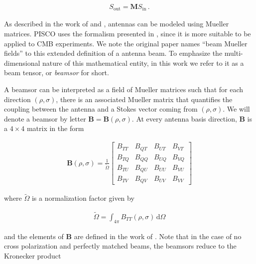 \documentclass[a4paper,11pt]{article}
\begin{document}
\begin{equation}
\begin{aligned}
S_{\mathrm{out}} = \mathbf{M} S_{\mathrm{in}} \, .
\end{aligned}
\end{equation}

\noindent
As described in the work of \cite{piepmeier_long_njoku_2008} and \cite{2007MNRAS.376.1767O}, antennas can be modeled using Mueller matrices. PISCO uses the formalism presented in \cite{2007MNRAS.376.1767O}, since it is more suitable to be applied to CMB experiments. We note the original paper names ``beam Mueller fields'' to this extended definition of a antenna beam. To emphasize the multi-dimensional nature of this mathematical entity, in this work we refer to it as a beam tensor, or \textsl{beamsor} for short.

A beamsor can be interpreted as a field of Mueller matrices such that for each direction $(\rho,\sigma)$, there is an associated Mueller matrix that quantifies the coupling between the antenna and a Stokes vector coming from $(\rho,\sigma)$. We will denote a beamsor by letter $\mathbf{B} = \mathbf{B}(\rho,\sigma)$. At every antenna basis direction, $\mathbf{B}$ is a $4\times4$ matrix in the form

\begin{equation}
\begin{aligned}
\mathbf{B}(\rho,\sigma) = \frac{1}{\tilde{\Omega}}
\begin{bmatrix}
B_{TT} & B_{QT} & B_{UT} & B_{VT}\\
B_{TQ} & B_{QQ} & B_{UQ} & B_{VQ}\\
B_{TU} & B_{QU} & B_{UU} & B_{VU}\\
B_{TV} & B_{QV} & B_{UV} & B_{VV}
\end{bmatrix}
\end{aligned}
\label{eq::beamsor}
\end{equation}

\noindent
where $\tilde{\Omega}$ is a normalization factor given by

\begin{equation}
\begin{aligned}
\tilde{\Omega} = \int_{4\pi} B_{TT}(\rho,\sigma) \, \mathrm{d} \Omega
\end{aligned}
\end{equation}

\noindent
and the elements of $\mathbf{B}$ are defined in the work of \cite{2007MNRAS.376.1767O}. Note that in the case of no cross polarization and perfectly matched beams, the beamsors reduce to the Kronecker product 
\end{document}
